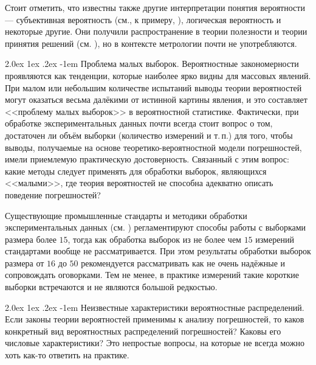 \documentclass[a5paper,openany]{book}
\makeatletter
\renewcommand\paragraph{\@startsection{paragraph}{4}{\z@}%
                         {2.0ex \@plus1ex \@minus.2ex}%
                         {-1em}%
                         {\normalfont\normalsize\bfseries}}
\makeatother
\begin{document}
Стоит отметить, что известны также другие интерпретации понятия вероятности --- 
субъективная вероятность (см., к примеру, \cite{deGroot}), логическая вероятность 
и некоторые другие. Они получили распространение в теории полезности и теории принятия 
решений (см. \cite{HRaifa}), но в контексте метрологии почти не употребляются. 
  
  
\paragraph{Проблема малых выборок.} 
Вероятностные закономерности проявляются как тенденции, которые наиболее ярко видны 
для массовых явлений. При малом или небольшим количестве испытаний выводы теории 
вероятностей могут оказаться весьма далёкими от истинной картины явления, и это 
составляет <<проблему малых выборок>> в вероятностной статистике. Фактически, 
при обработке экспериментальных данных почти всегда стоит вопрос о том, достаточен ли 
объём выборки (количество измерений и т.\,п.) для того, чтобы выводы, получаемые 
на основе теоретико-вероятностной модели погрешностей, имели приемлемую практическую 
достоверность. Связанный с этим вопрос: какие методы следует применять для обработки 
выборок, являющихся <<малыми>>, где теория вероятностей не способна адекватно описать 
поведение погрешностей?  
  
Существующие промышленные стандарты и методики обработки экспериментальных данных (см. 
\cite{GOSTDirect,GOSTIndirect}) регламентируют способы работы с выборками размера 
более $15$, тогда как обработка выборок из не более чем $15$ измерений стандартами 
вообще не рассматривается. При этом результаты обработки выборок размера от $16$ 
до $50$ рекомендуется рассматривать как не очень надёжные и сопровождать оговорками. 
Тем не менее, в практике измерений такие короткие выборки встречаются и не являются 
большой редкостью. 
  
  
\paragraph{Неизвестные характеристики вероятностные распределений.} 
Если законы теории вероятностей применимы к анализу погрешностей, то каков конкретный 
вид вероятностных распределений погрешностей? Каковы его числовые характеристики? 
Это непростые вопросы, на которые не всегда можно хоть как-то ответить на практике. 
   
\end{document}
